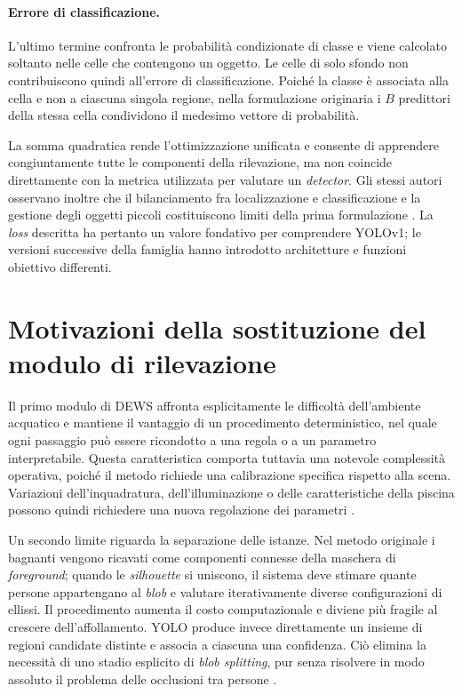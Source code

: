 \paragraph{Errore di classificazione.}
L'ultimo termine confronta le probabilità condizionate di classe e viene calcolato soltanto nelle celle che contengono un oggetto. Le celle di solo sfondo non contribuiscono quindi all'errore di classificazione. Poiché la classe è associata alla cella e non a ciascuna singola regione, nella formulazione originaria i $B$ predittori della stessa cella condividono il medesimo vettore di probabilità.

La somma quadratica rende l'ottimizzazione unificata e consente di apprendere congiuntamente tutte le componenti della rilevazione, ma non coincide direttamente con la metrica utilizzata per valutare un \textit{detector}. Gli stessi autori osservano inoltre che il bilanciamento fra localizzazione e classificazione e la gestione degli oggetti piccoli costituiscono limiti della prima formulazione \cite{Redmon2016YOLO}. La \textit{loss} descritta ha pertanto un valore fondativo per comprendere YOLOv1; le versioni successive della famiglia hanno introdotto architetture e funzioni obiettivo differenti.

\section{Motivazioni della sostituzione del modulo di rilevazione}

Il primo modulo di DEWS affronta esplicitamente le difficoltà dell'ambiente acquatico e mantiene il vantaggio di un procedimento deterministico, nel quale ogni passaggio può essere ricondotto a una regola o a un parametro interpretabile. Questa caratteristica comporta tuttavia una notevole complessità operativa, poiché il metodo richiede una calibrazione specifica rispetto alla scena. Variazioni dell'inquadratura, dell'illuminazione o delle caratteristiche della piscina possono quindi richiedere una nuova regolazione dei parametri \cite{Eng2004Region,Eng2006Robust,Eng2008DEWS}.

Un secondo limite riguarda la separazione delle istanze. Nel metodo originale i bagnanti vengono ricavati come componenti connesse della maschera di \textit{foreground}; quando le \textit{silhouette} si uniscono, il sistema deve stimare quante persone appartengano al \textit{blob} e valutare iterativamente diverse configurazioni di ellissi. Il procedimento aumenta il costo computazionale e diviene più fragile al crescere dell'affollamento. YOLO produce invece direttamente un insieme di regioni candidate distinte e associa a ciascuna una confidenza. Ciò elimina la necessità di uno stadio esplicito di \textit{blob splitting}, pur senza risolvere in modo assoluto il problema delle occlusioni tra persone \cite{Eng2008DEWS,Redmon2016YOLO}.

